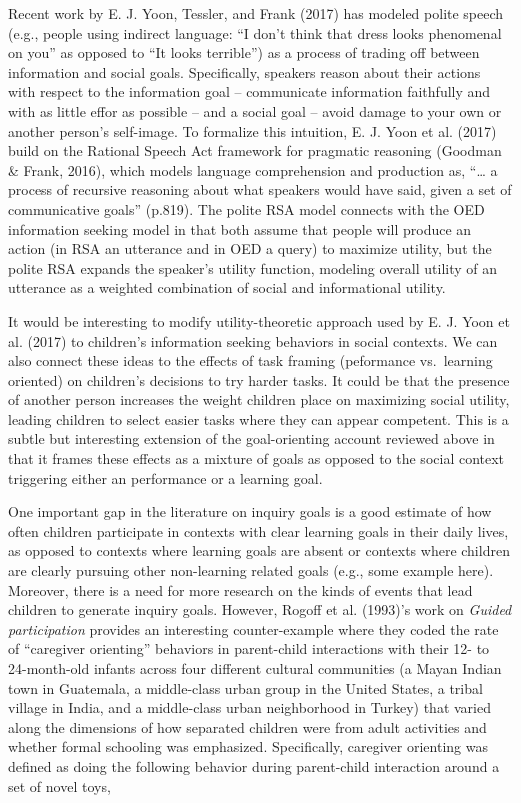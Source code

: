\documentclass[english,floatsintext,man]{apa6}
\theoremstyle{definition}
\theoremstyle{definition}
\theoremstyle{definition}
\theoremstyle{remark}
\begin{document}
Recent work by E. J. Yoon, Tessler, and Frank (2017) has modeled polite
speech (e.g., people using indirect language: \enquote{I don't think
that dress looks phenomenal on you} as opposed to \enquote{It looks
terrible}) as a process of trading off between information and social
goals. Specifically, speakers reason about their actions with respect to
the information goal -- communicate information faithfully and with as
little effor as possible -- and a social goal -- avoid damage to your
own or another person's self-image. To formalize this intuition, E. J.
Yoon et al. (2017) build on the Rational Speech Act framework for
pragmatic reasoning (Goodman \& Frank, 2016), which models language
comprehension and production as, \enquote{\ldots{} a process of
recursive reasoning about what speakers would have said, given a set of
communicative goals} (p.819). The polite RSA model connects with the OED
information seeking model in that both assume that people will produce
an action (in RSA an utterance and in OED a query) to maximize utility,
but the polite RSA expands the speaker's utility function, modeling
overall utility of an utterance as a weighted combination of social and
informational utility.

It would be interesting to modify utility-theoretic approach used by E.
J. Yoon et al. (2017) to children's information seeking behaviors in
social contexts. We can also connect these ideas to the effects of task
framing (peformance vs.~learning oriented) on children's decisions to
try harder tasks. It could be that the presence of another person
increases the weight children place on maximizing social utility,
leading children to select easier tasks where they can appear competent.
This is a subtle but interesting extension of the goal-orienting account
reviewed above in that it frames these effects as a mixture of goals as
opposed to the social context triggering either an performance or a
learning goal.

One important gap in the literature on inquiry goals is a good estimate
of how often children participate in contexts with clear learning goals
in their daily lives, as opposed to contexts where learning goals are
absent or contexts where children are clearly pursuing other
non-learning related goals (e.g., some example here). Moreover, there is
a need for more research on the kinds of events that lead children to
generate inquiry goals. However, Rogoff et al. (1993)'s work on
\emph{Guided participation} provides an interesting counter-example
where they coded the rate of \enquote{caregiver orienting} behaviors in
parent-child interactions with their 12- to 24-month-old infants across
four different cultural communities (a Mayan Indian town in Guatemala, a
middle-class urban group in the United States, a tribal village in
India, and a middle-class urban neighborhood in Turkey) that varied
along the dimensions of how separated children were from adult
activities and whether formal schooling was emphasized. Specifically,
caregiver orienting was defined as doing the following behavior during
parent-child interaction around a set of novel toys,
\end{document}
